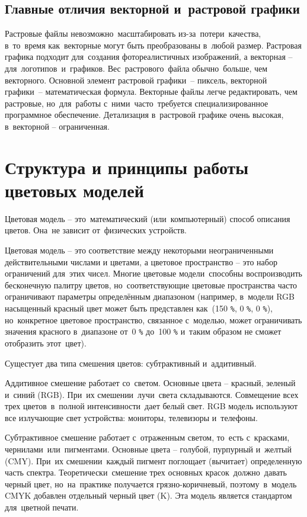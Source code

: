 \documentclass{ou}
\begin{document}
\subsection{Главные отличия векторной и~растровой графики}
Растровые файлы невозможно~масштабировать из-за~потери~качества, в~то~время как~векторные могут быть преобразованы в~любой размер. Растровая графика подходит для~создания фотореалистичных изображений, а векторная -- для~логотипов~и~графиков. Вес~растрового~файла обычно~больше, чем векторного. Основной элемент растровой графики~-- пиксель, векторной графики~-- математическая формула. Векторные файлы легче редактировать, чем растровые, но~для~работы с~ними~часто~требуется специализированное программное обеспечение. Детализация в~растровой графике очень высокая, в~векторной -- ограниченная.
\newpage
\section{Структура и принципы работы цветовых моделей}
Цветовая модель -- это~математический (или~компьютерный) способ описания цветов. Она~не зависит от~физических устройств.

Цветовая модель -- это соответствие между некоторыми неограниченными действительными числами и цветами, а цветовое пространство -- это набор ограничений для~этих чисел. Многие цветовые модели~способны воспроизводить бесконечную палитру цветов, но~соответствующие цветовые пространства часто ограничивают параметры определённым диапазоном (например, в~модели RGB насыщенный красный цвет может быть представлен как~(150 \verb|%|, 0 \verb|%|, 0 \verb|%|), но~конкретное цветовое пространство, связанное с~моделью, может ограничивать значения красного в~диапазоне от~0 \verb|%| до~100 \verb|%| и~таким образом не сможет отобразить этот~цвет).

Сущестует два типа смешения цветов: субтрактивный и~аддитивный.

Аддитивное смешение работает со~светом. Основные цвета -- красный, зеленый и~синий (RGB). При~их смешении~лучи~света складываются. Совмещение всех трех цветов~в~полной интенсивности~дает белый свет. RGB модель используют все излучающие свет устройства: мониторы, телевизоры и~телефоны.

Субтрактивное смешение работает с~отраженным светом, то~есть с~красками, чернилами~или~пигментами. Основные цвета -- голубой, пурпурный и~желтый (CMY). При~их смешении~каждый пигмент поглощает (вычитает) определенную часть спектра. Теоретически~смешение трех основных красок~должно~давать черный цвет, но~на~практике получается грязно-коричневый, поэтому~в~модель CMYK добавлен отдельный черный цвет (K). Эта модель является стандартом для~цветной печати.
\end{document}
